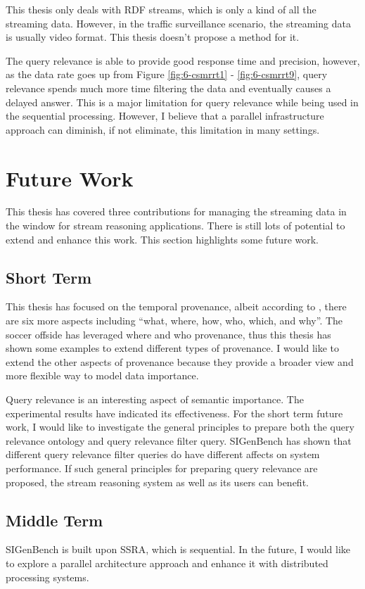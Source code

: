 This thesis only deals with RDF streams, which is only a kind of all the streaming data.
However, in the traffic surveillance scenario, the streaming data is usually video format. 
This thesis doesn't propose a method for it. 

The query relevance is able to provide good response time and precision, however, as the data rate goes up from Figure \ref{fig:6-csmrrt1} - \ref{fig:6-csmrrt9}, query relevance spends much more time filtering the data and eventually causes a delayed answer. 
This is a major limitation for query relevance while being used in the sequential processing. 
However, I believe that a parallel infrastructure approach can diminish, if not eliminate, this limitation in many settings.
%
\section{Future Work}
This thesis has covered three contributions for managing the streaming data in the window for stream reasoning applications.
There is still lots of potential to extend and enhance this work. 
This section highlights some future work.
%
\subsection{Short Term}
This thesis has focused on the temporal provenance, albeit according to \cite{ram2009new}, there are six more aspects including ``what, where, how, who, which, and why''.
The soccer offside has leveraged where and who provenance, thus this thesis has shown some examples to extend different types of provenance.
I would like to extend the other aspects of provenance because they provide a broader view and more flexible way to model data importance.

Query relevance is an interesting aspect of semantic importance.
The experimental results have indicated its effectiveness. 
For the short term future work, I would like to investigate the general principles to prepare both the query relevance ontology and query relevance filter query. 
SIGenBench has shown that different query relevance filter queries do have different affects on system performance. 
If such general principles for preparing query relevance are proposed, the stream reasoning system as well as its users can benefit.
%
\subsection{Middle Term}
SIGenBench is built upon SSRA, which is sequential.
In the future, I would like to explore a parallel architecture approach and enhance it with distributed processing systems.

